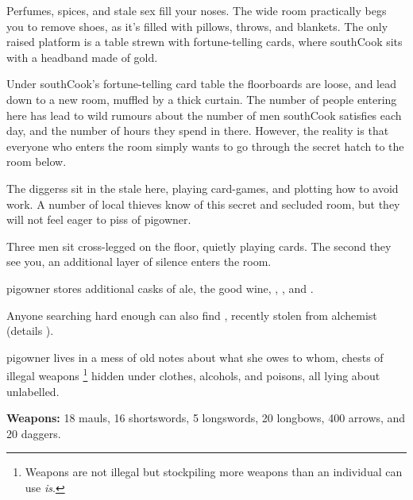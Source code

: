 \begin{multicols}{2}
\begin{boxtext}
  Perfumes, spices, and stale sex fill your noses.
  The wide room practically begs you to remove shoes, as it's filled with pillows, throws, and blankets.
  The only raised platform is a table strewn with fortune-telling cards, where \gls{southCook} sits with a headband made of gold.
\end{boxtext}

\southCook

Under \gls{southCook}'s fortune-telling card table the floorboards are loose, and lead down to a new room, muffled by a thick curtain.
The number of people entering here has lead to wild rumours about the number of men \gls{southCook} satisfies each day, and the number of hours they spend in there.
However, the reality is that everyone who enters the room simply wants to go through the secret hatch to the room below.

\null
{}
The \glspl{diggers} sit in the stale here, playing card-games, and plotting how to avoid work.
A number of local thieves know of this secret and secluded room, but they will not feel eager to piss of \gls{pigowner}.

\begin{boxtext}
  Three men sit cross-legged on the floor, quietly playing cards.
  The second they see you, an additional layer of silence enters the room.
\end{boxtext}



\Gls{pigowner} stores additional casks of ale, the good wine, \rations, \rations, and \rations.

Anyone searching hard enough can also find \lootTalisman, recently stolen from \gls{alchemist} (details ).


\Gls{pigowner} lives in a mess of old notes about what she owes to whom, chests of illegal weapons%
\footnote{Weapons are not illegal but stockpiling more weapons than an individual can use \emph{is}.}
hidden under clothes, alcohols, and poisons, all lying about unlabelled.

\textbf{Weapons:} 18 mauls, 16 shortswords, 5 longswords, 20 longbows, 400 arrows, and 20 daggers.



\end{multicols}
